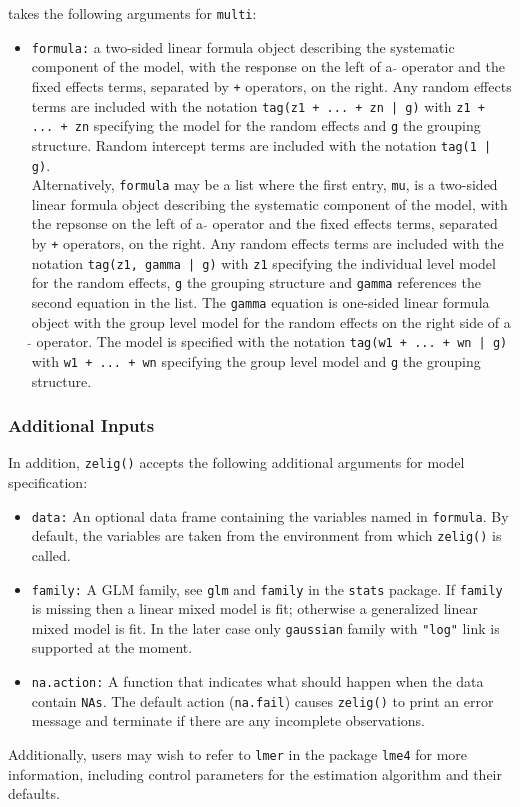  takes the following arguments for {\tt multi}:
\begin{itemize}
\item {\tt formula:} a two-sided linear formula object describing the systematic component of the model, with the response on the left of a {\tt $\tilde{}$} operator and the fixed effects terms, separated by {\tt +} operators, on the right. Any random effects terms are included with the notation {\tt tag(z1 + ... + zn | g)} with {\tt z1 + ... + zn} specifying the model for the random effects and {\tt g} the grouping structure. Random intercept terms are included with the notation {\tt tag(1 | g)}. \\
Alternatively, {\tt formula} may be a list where the first entry, {\tt mu}, is a two-sided linear formula object describing the systematic component of the model, with the repsonse on the left of a {\tt $\tilde{}$} operator and the fixed effects terms, separated by {\tt +} operators, on the right. Any random effects terms are included with the notation {\tt tag(z1, gamma | g)} with {\tt z1} specifying the individual level model for the random effects, {\tt g} the grouping structure and {\tt gamma} references the second equation in the list. The {\tt gamma} equation is one-sided linear formula object with the group level model for the random effects on the right side of a {\tt $\tilde{}$} operator. The model is specified with the notation {\tt tag(w1 + ... + wn | g)} with {\tt w1 + ... + wn} specifying the group level model and {\tt g} the grouping structure.
\end{itemize}

\subsubsection{Additional Inputs}

In addition, {\tt zelig()} accepts the following additional arguments for model specification:

\begin{itemize}
\item {\tt data:} An optional data frame containing the variables named in {\tt formula}. By default, the variables are taken from the environment from which {\tt zelig()} is called.
\item {\tt family:} A GLM family, see {\tt glm} and {\tt family} in the {\tt stats} package. If {\tt family} is missing then a linear mixed model is fit; otherwise a generalized linear mixed model is fit. In the later case only {\tt gaussian} family with {\tt "log"} link is supported at the moment.
\item {\tt na.action:} A function that indicates what should happen when the data contain {\tt NAs}. The default action ({\tt na.fail}) causes {\tt zelig()} to print an error message and terminate if there are any incomplete observations.
\end{itemize}
Additionally, users may wish to refer to {\tt lmer} in the package {\tt lme4} for more information, including control parameters for the estimation algorithm and their defaults.

